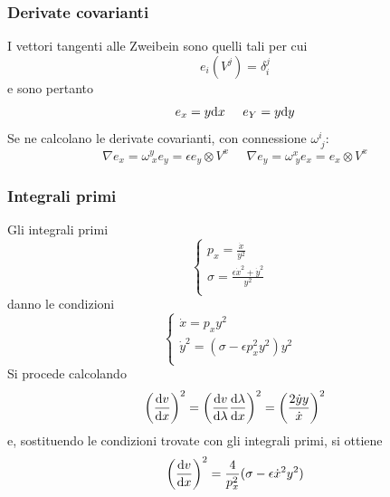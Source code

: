 \subsubsection*{Derivate covarianti}
I vettori tangenti alle Zweibein sono quelli tali per cui
\[ e_i(V^j) = \delta_i^j \]
e sono pertanto
\[ e_x = y \mathrm{d} x \;\;\;\;\; e_Y = y\mathrm{d} y \]
Se ne calcolano le derivate covarianti, con connessione $\omega^i_{\;j}$:
\begin{equation} \label{eq:der_vettori}
	\nabla e_x = \omega^y_{\;x} e_y = \epsilon e_y \otimes V^x \;\;\;\;\; \nabla e_y = \omega^x_{\;y} e_x =  e_x \otimes V^x 
\end{equation}



\subsubsection*{Integrali primi}
Gli integrali primi
\[ \begin{cases}
	p_x = \frac{\dot{x}}{y^2} & \\
	\sigma = \frac{\epsilon\dot{x}^2 + \dot{y}^2}{y^2} & \\
  \end{cases}
\]
danno le condizioni
\[ \begin{cases}
	\dot{x} = p_x y^2 & \\
	\dot{y}^2 = (\sigma - \epsilon p_x^2 y^2 ) y^2 & \\
  \end{cases}
\]
Si procede calcolando
\[ \left(\frac{\mathrm{d} v}{\mathrm{d} x}\right)^2 = \left( \frac{\mathrm{d} v}{\mathrm{d} \lambda} \frac{\mathrm{d} \lambda}{\mathrm{d} x}  \right)^2 
	= \left( \frac{2\dot{y}y}{\dot{x}} \right)^2 \]
e, sostituendo le condizioni trovate con gli integrali primi, si ottiene
\[ \left(\frac{\mathrm{d} v}{\mathrm{d} x}\right)^2 = \frac{4}{p_x^2} (\sigma - \epsilon\dot{x}^2 y^2 )\]

